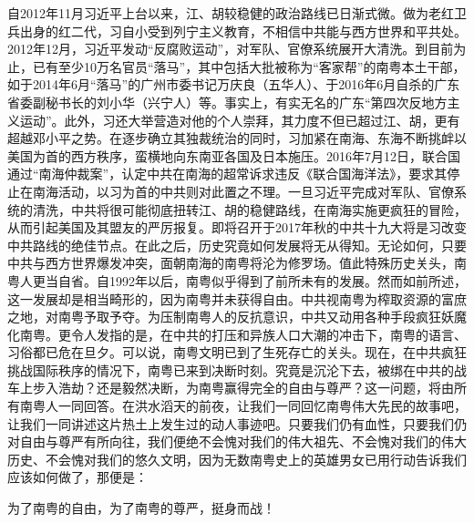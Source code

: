 自2012年11月习近平上台以来，江、胡较稳健的政治路线已日渐式微。做为老红卫兵出身的红二代，习自小受到列宁主义教育，不相信中共能与西方世界和平共处。2012年12月，习近平发动“反腐败运动”，对军队、官僚系统展开大清洗。到目前为止，已有至少10万名官员“落马”，其中包括大批被称为“客家帮”的南粤本土干部，如于2014年6月“落马”的广州市委书记万庆良（五华人）、于2016年6月自杀的广东省委副秘书长的刘小华（兴宁人）等。事实上，有实无名的广东“第四次反地方主义运动”。此外，习还大举营造对他的个人崇拜，其力度不但已超过江、胡，更有超越邓小平之势。在逐步确立其独裁统治的同时，习加紧在南海、东海不断挑衅以美国为首的西方秩序，蛮横地向东南亚各国及日本施压。2016年7月12日，联合国通过“南海仲裁案”，认定中共在南海的超常诉求违反《联合国海洋法》，要求其停止在南海活动，以习为首的中共则对此置之不理。一旦习近平完成对军队、官僚系统的清洗，中共将很可能彻底扭转江、胡的稳健路线，在南海实施更疯狂的冒险，从而引起美国及其盟友的严厉报复。即将召开于2017年秋的中共十九大将是习改变中共路线的绝佳节点。在此之后，历史究竟如何发展将无从得知。无论如何，只要中共与西方世界爆发冲突，面朝南海的南粤将沦为修罗场。值此特殊历史关头，南粤人更当自省。自1992年以后，南粤似乎得到了前所未有的发展。然而如前所述，这一发展却是相当畸形的，因为南粤并未获得自由。中共视南粤为榨取资源的富庶之地，对南粤予取予夺。为压制南粤人的反抗意识，中共又动用各种手段疯狂妖魔化南粤。更令人发指的是，在中共的打压和异族人口大潮的冲击下，南粤的语言、习俗都已危在旦夕。可以说，南粤文明已到了生死存亡的关头。现在，在中共疯狂挑战国际秩序的情况下，南粤已来到决断时刻。究竟是沉沦下去，被绑在中共的战车上步入浩劫？还是毅然决断，为南粤赢得完全的自由与尊严？这一问题，将由所有南粤人一同回答。在洪水滔天的前夜，让我们一同回忆南粤伟大先民的故事吧，让我们一同讲述这片热土上发生过的动人事迹吧。只要我们仍有血性，只要我们仍对自由与尊严有所向往，我们便绝不会愧对我们的伟大祖先、不会愧对我们的伟大历史、不会愧对我们的悠久文明，因为无数南粤史上的英雄男女已用行动告诉我们应该如何做了，那便是：

为了南粤的自由，为了南粤的尊严，挺身而战！

